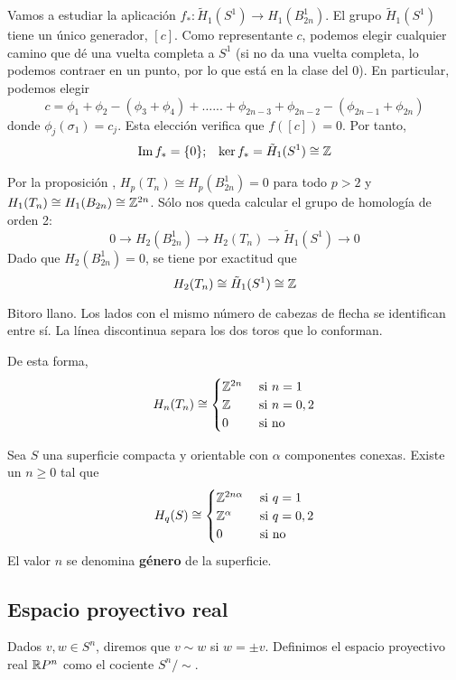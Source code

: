 Vamos a estudiar la aplicación $f_*: \tilde{H}_1(S^1) \to H_1(B^1_{2n})$. El
grupo $\tilde{H}_1(S^1)$ tiene un único generador, $[c]$. Como representante
$c$, podemos elegir cualquier camino que dé una vuelta completa a $S^1$ (si no
da una vuelta completa, lo podemos contraer en un punto, por lo que está en la
clase del $0$). En particular, podemos elegir
\[c=\phi_1+\phi_2-(\phi_3+\phi_4)+\dots...+
	\phi_{2n-3}+\phi_{2n-2}-(\phi_{2n-1}+\phi_{2n})\]
donde $\phi_j(\sigma_1)=c_j$. Esta elección verifica que $f([c])=0$. Por tanto,
\begin{align*}
\operatorname{Im} f_*=\{0\}; && \ker f_*=\tilde H_1(S^1)\cong \mathbb{Z}
\end{align*}

Por la proposición , $H_p(T_n)\cong H_p(B^1_{2n})=0$ para todo
$p > 2$ y $H_1(T_n) \cong H_1(B_{2n})\cong \mathbb{Z}^{2n}$. Sólo nos queda
calcular el grupo de homología de orden 2:
\[0 \longrightarrow H_2(B^1_{2n}) \longrightarrow H_2(T_n) \longrightarrow
\tilde{H}_1(S^1) \longrightarrow 0\]
Dado que $H_2(B^1_{2n})=0$, se tiene por exactitud que
\[H_2(T_n) \cong \tilde{H}_1(S^1) \cong \mathbb{Z}\]

\begin{marginfigure}


\caption[Bitoro llano.]{ Bitoro llano. Los lados con el mismo
número de cabezas de flecha se identifican entre sí. La línea discontinua
separa los dos toros que lo conforman.}
\end{marginfigure}

De esta forma, \[H_n(T_n)\cong
\begin{cases}
\mathbb{Z}^{2n}	&\text{ si $n =1$}\\
\mathbb{Z}		&\text{ si $n=0,2$}\\
0			&\text{ si no}
\end{cases}\]

\begin{theorem}
Sea $S$ una superficie compacta y orientable con $\alpha$ componentes
conexas. Existe un $n \geq 0$ tal que
\[H_q(S)\cong \begin{cases}
\mathbb{Z}^{2n\alpha}	&\text{ si $q =1$}\\
\mathbb{Z}^\alpha		&\text{ si $q =0,2$}\\
0   				&\text{ si no}
\end{cases}\]
El valor $n$ se denomina \textbf{género} de la superficie.
\end{theorem}

\subsection{Espacio proyectivo real}
\begin{definition}
Dados $v,w \in S^n$, diremos que $v \sim w$ si $w=\pm v$. Definimos el espacio
proyectivo real $\mathbb{R}P^n$ como el cociente $S^n/\sim$.
\end{definition}

